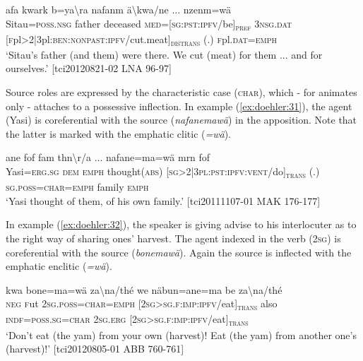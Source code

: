 \documentclass[output=paper]{langscibook}
\begin{document}
\ea
	 {afa} {kwark} {b=ya\textbackslash{r}a} {nafanm} {ä\textbackslash{kwa}/ne} ... {nzenm=wä}\\
	Sitau=\textsc{poss}.\textsc{nsg}{} father deceased \textsc{med}=[\textsc{sg}:\textsc{pst}:\textsc{ipfv}/be]\textsubscript{\textsc{pref}} \textsc{3nsg}.\textsc{dat}{} [\textsc{f}pl>2|3pl:\textsc{ben}:\textsc{nonpast}:\textsc{ipfv}/cut.meat]\textsubscript{\textsc{distrans}} (.) \textsc{f}pl.\textsc{dat}=\textsc{emph}{}\\
	\glt `Sitau's father (and them) were there. We cut (meat) for them ... and for ourselves.' [tci20120821-02 LNA 96-97] %
	\label{ex:doehler:30}
	\z


Source roles are expressed by the characteristic case (\textsc{char}), which - for animates only - attaches to a possessive inflection. In example (\ref{ex:doehler:31}), the agent ({Yasi}) is coreferential with the source (\emph{nafanemawä}) in the apposition. Note that the latter is marked with the emphatic clitic (\emph{=wä}).


\ea
	 {ane} {fof} {fam} {thn\textbackslash{r}/a} ... {nafane=ma=wä} {mrn} {fof}\\
	Yasi=\textsc{erg}.\textsc{sg}{} \textsc{dem}{} \textsc{emph}{} thought(\textsc{abs}) [\textsc{sg}>2|3\textsc{pl}:\textsc{pst}:\textsc{ipfv}:\textsc{vent}/do]\textsubscript{\textsc{trans}} (.) \textsc{sg}.\textsc{poss}=\textsc{char}=\textsc{emph}{} family \textsc{emph}{}\\
	\glt `Yasi thought of them, of his own family.'
	[tci20111107-01 MAK 176-177]
	\label{ex:doehler:31}
\z


In example (\ref{ex:doehler:32}), the speaker is giving advise to his interlocuter as to the right way of sharing ones' harvest. The agent indexed in the verb (\textsc{2sg}) is coreferential with the source (\emph{bonemawä}). Again the source is inflected with the emphatic enclitic (\emph{=wä}).


\ea
	 {kwa} {bone=ma=wä} {za\textbackslash{na}/thé} {we} {näbun=ane=ma} {be} {za\textbackslash{na}/thé}\\
	\textsc{neg}{} \textsc{f}ut{} \textsc{2sg}.\textsc{poss}=\textsc{char}=\textsc{emph}{} [\textsc{2sg}>\textsc{sg}.\textsc{f}:\textsc{imp}:\textsc{ipfv}/eat]\textsubscript{\textsc{trans}} also \textsc{indf}=\textsc{poss}.\textsc{sg}=\textsc{char}{} \textsc{2sg}.\textsc{erg}{} [\textsc{2sg}>\textsc{sg}.\textsc{f}:\textsc{imp}:\textsc{ipfv}/eat]\textsubscript{\textsc{trans}}\\
	\glt `Don't eat (the yam) from your own (harvest)! Eat (the yam) from another one's (harvest)!' %
	[tci20120805-01 ABB 760-761]
	\label{ex:doehler:32}
\z
\end{document}
